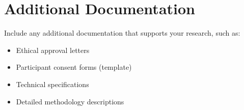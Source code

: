 \section{Additional Documentation}

Include any additional documentation that supports your research, such as:

\begin{itemize}
    \item Ethical approval letters
    \item Participant consent forms (template)
    \item Technical specifications
    \item Detailed methodology descriptions
\end{itemize}